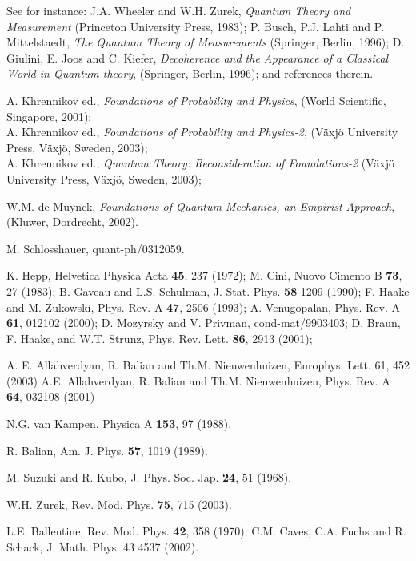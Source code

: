 \documentclass[aps,prb,floatfix,twocolumn]{revtex4}
\begin{document}
\begin{thebibliography}{99}

 See for instance:
J.A. Wheeler and W.H. Zurek, {\it Quantum Theory and Measurement} 
(Princeton University Press, 1983);
P. Busch, P.J. Lahti and P. Mittelstaedt, 
{\it The Quantum Theory of Measurements} (Springer, Berlin, 1996);
D. Giulini, E. Joos and C. Kiefer,
{\it Decoherence and the Appearance of a Classical World in Quantum theory}, 
(Springer, Berlin, 1996);
and references therein.

A. Khrennikov ed., {\it Foundations of Probability and Physics},
(World Scientific, Singapore, 2001); \\
A. Khrennikov ed., {\it Foundations of Probability and Physics-2},
(V\"axj\"o University Press, V\"axj\"o, Sweden, 2003); \\
A. Khrennikov ed., {\it Quantum Theory: Reconsideration of Foundations-2}
(V\"axj\"o University Press, V\"axj\"o, Sweden, 2003);

W.M. de Muynck, {\it Foundations of Quantum Mechanics, an Empirist Approach}, 
(Kluwer, Dordrecht, 2002).

 M. Schlosshauer, quant-ph/0312059.


 K. Hepp, Helvetica Physica Acta {\bf 45}, 237 (1972);
M. Cini, Nuovo Cimento B {\bf 73}, 27 (1983);
B. Gaveau and L.S. Schulman, J. Stat. Phys. {\bf 58} 1209 (1990); 
F. Haake and M. Zukowski, Phys. Rev. A {\bf 47}, 2506 (1993);
A. Venugopalan, Phys. Rev. A {\bf 61}, 012102 (2000);
D. Mozyrsky and V. Privman, cond-mat/9903403;
D. Braun, F. Haake, and W.T. Strunz, Phys. Rev. Lett. {\bf 86}, 2913 (2001);

  A. E. Allahverdyan, R. Balian and 
Th.M.  Nieuwenhuizen,  Europhys. Lett. 61, 452 (2003) 
 A.E. Allahverdyan, R. Balian and Th.M. Nieuwenhuizen, 
Phys. Rev. A {\bf 64}, 032108 (2001)


 N.G. van Kampen, Physica A {\bf 153}, 97 (1988).

 R. Balian, Am. J. Phys. {\bf 57}, 1019 (1989).

M. Suzuki and R. Kubo, J. Phys. Soc. Jap. {\bf 24}, 51 (1968).

 W.H. Zurek, Rev. Mod. Phys. {\bf 75}, 715 (2003).


L.E. Ballentine, Rev. Mod. Phys. {\bf 42}, 358 (1970);
C.M. Caves, C.A. Fuchs and R. Schack, J. Math. Phys. 43  4537 (2002).


\end{thebibliography}
\end{document}

